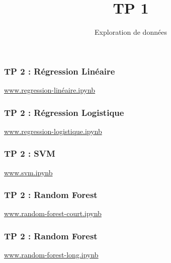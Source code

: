 \documentclass{formation}
\title{TP 1}
\subtitle{Exploration de données}
\begin{document}
\maketitle

\begin{frame}
  \frametitle{TP 2 : Régression Linéaire}
  \begin{center}
    \href{https://colab.research.google.com/drive/1CAkh09NmO-smYF9h3C5AA_69CZ9d7sTq}{www.regression-linéaire.ipynb}
  \end{center}
\end{frame}

\begin{frame}
  \frametitle{TP 2 : Régression Logistique}
  \begin{center}
    \href{https://colab.research.google.com/drive/1n0fw_WMFTHjK0NwwVOzUnV31keNx6Sng}{www.regression-logistique.ipynb}
  \end{center}
\end{frame}

\begin{frame}
  \frametitle{TP 2 : SVM}
  \begin{center}
    \href{https://colab.research.google.com/drive/1qbf95qZj0rW0cSzfIXUDHGwe0KrTOe8f}{www.svm.ipynb}
  \end{center}
\end{frame}

\begin{frame}
  \frametitle{TP 2 : Random Forest}
  \begin{center}
    \href{https://colab.research.google.com/drive/1zVDe4ZdTZngGHFtI1c7Ky52WTJDWLTv2}{www.random-forest-court.ipynb}
  \end{center}
\end{frame}

\begin{frame}
  \frametitle{TP 2 : Random Forest}
  \begin{center}
    \href{https://colab.research.google.com/drive/1ooL-E238TCsFQURfnKGY9uqjyXqRqySl}{www.random-forest-long.ipynb}
  \end{center}
\end{frame}
\end{document}
